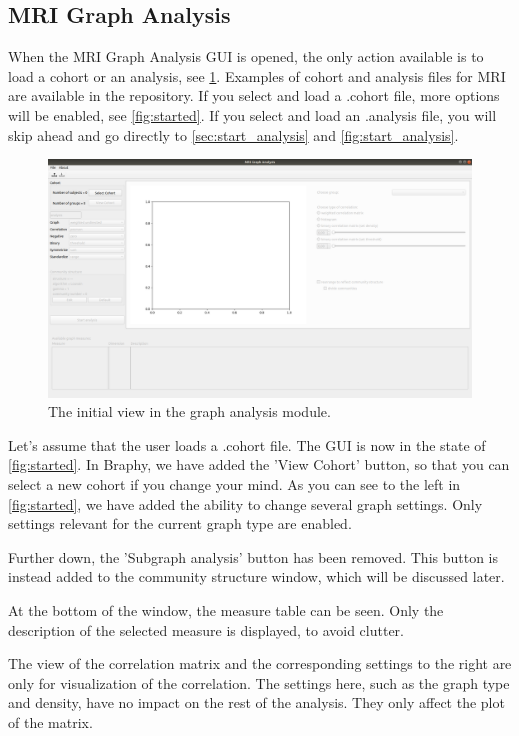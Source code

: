 \documentclass{article}
\begin{document}
\subsection{MRI Graph Analysis}
\label{sec:mri_ga}

When the MRI Graph Analysis GUI is opened, the only action available is to load a cohort or an analysis, see \cref{fig:locked}. Examples of cohort and analysis files for MRI are available in the repository. If you select and load a .cohort file, more options will be enabled, see \cref{fig:started}. If you select and load an .analysis file, you will skip ahead and go directly to \cref{sec:start_analysis} and \cref{fig:start_analysis}.

\begin{figure}[H]
    \centering
    \includegraphics[width=0.9\linewidth]{graph_analysis_locked.png}
    \caption{The initial view in the graph analysis module.}
    \label{fig:locked}
\end{figure}

Let's assume that the user loads a .cohort file. The GUI is now in the state of \cref{fig:started}. In Braphy, we have added the 'View Cohort' button, so that you can select a new cohort if you change your mind. As you can see to the left in \cref{fig:started}, we have added the ability to change several graph settings. Only settings relevant for the current graph type are enabled. 

Further down, the 'Subgraph analysis' button has been removed. This button is instead added to the community structure window, which will be discussed later. 

At the bottom of the window, the measure table can be seen. Only the description of the selected measure is displayed, to avoid clutter.

The view of the correlation matrix and the corresponding settings to the right are only for visualization of the correlation. The settings here, such as the graph type and density, have no impact on the rest of the analysis. They only affect the plot of the matrix.
\end{document}

